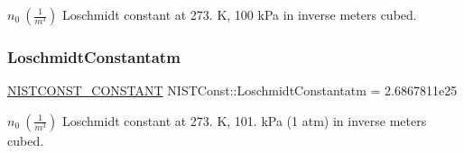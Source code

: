 $n_0 \ (\frac{1}{m^3})$ Loschmidt constant at 273. K, 100 k\+Pa in inverse meters cubed. \mbox{\label{group___n_i_s_t_const-_loschmidt_constant_gae68f5d2d04353bd4cf30faa8cb935734}} 
\subsubsection{\texorpdfstring{Loschmidt\+Constantatm}{LoschmidtConstantatm}}
{\footnotesize\ttfamily \mbox{\hyperlink{_n_i_s_t_const_8hpp_a2b0fc1d7452373f816175dd86ce26729}{N\+I\+S\+T\+C\+O\+N\+S\+T\+\_\+\+C\+O\+N\+S\+T\+A\+NT}} N\+I\+S\+T\+Const\+::\+Loschmidt\+Constantatm = 2.\+6867811e25}

$n_0 \ (\frac{1}{m^3})$ Loschmidt constant at 273. K, 101. k\+Pa (1 atm) in inverse meters cubed. 